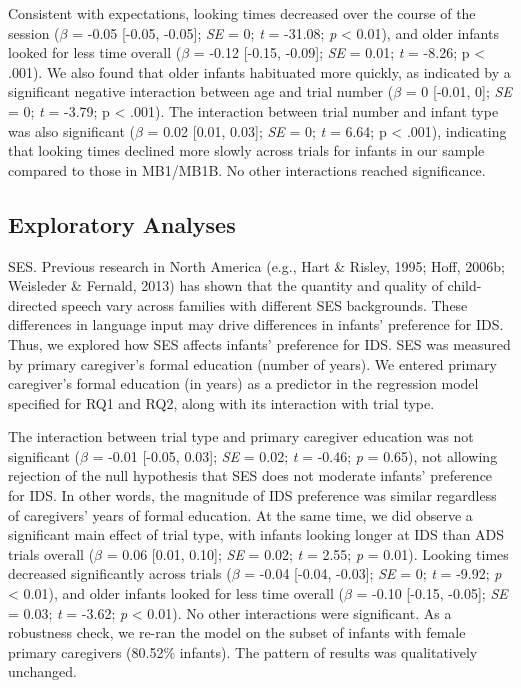 \documentclass[
  english,
  ,man,floatsintext]{apa6}
\begin{document}
Consistent with expectations, looking times decreased over the course of the session (\emph{\(\beta\)} = -0.05 {[}-0.05, -0.05{]}; \emph{SE} = 0; \emph{t} = -31.08; \emph{p} \textless{} 0.01), and older infants looked for less time overall (\emph{\(\beta\)} = -0.12 {[}-0.15, -0.09{]}; \emph{SE} = 0.01; \emph{t} = -8.26; p \textless{} .001). We also found that older infants habituated more quickly, as indicated by a significant negative interaction between age and trial number (\emph{\(\beta\)} = 0 {[}-0.01, 0{]}; \emph{SE} = 0; \emph{t} = -3.79; p \textless{} .001). The interaction between trial number and infant type was also significant (\emph{\(\beta\)} = 0.02 {[}0.01, 0.03{]}; \emph{SE} = 0; \emph{t} = 6.64; p \textless{} .001), indicating that looking times declined more slowly across trials for infants in our sample compared to those in MB1/MB1B. No other interactions reached significance.

\subsection{Exploratory Analyses}\label{exploratory-analyses}

SES. Previous research in North America (e.g., Hart \& Risley, 1995; Hoff, 2006b; Weisleder \& Fernald, 2013) has shown that the quantity and quality of child-directed speech vary across families with different SES backgrounds. These differences in language input may drive differences in infants' preference for IDS. Thus, we explored how SES affects infants' preference for IDS. SES was measured by primary caregiver's formal education (number of years). We entered primary caregiver's formal education (in years) as a predictor in the regression model specified for RQ1 and RQ2, along with its interaction with trial type.

The interaction between trial type and primary caregiver education was not significant (\emph{\(\beta\)} = -0.01 {[}-0.05, 0.03{]}; \emph{SE} = 0.02; \emph{t} = -0.46; \emph{p} = 0.65), not allowing rejection of the null hypothesis that SES does not moderate infants' preference for IDS. In other words, the magnitude of IDS preference was similar regardless of caregivers' years of formal education. At the same time, we did observe a significant main effect of trial type, with infants looking longer at IDS than ADS trials overall (\emph{\(\beta\)} = 0.06 {[}0.01, 0.10{]}; \emph{SE} = 0.02; \emph{t} = 2.55; \emph{p} = 0.01). Looking times decreased significantly across trials (\emph{\(\beta\)} = -0.04 {[}-0.04, -0.03{]}; \emph{SE} = 0; \emph{t} = -9.92; \emph{p} \textless{} 0.01), and older infants looked for less time overall (\emph{\(\beta\)} = -0.10 {[}-0.15, -0.05{]}; \emph{SE} = 0.03; \emph{t} = -3.62; \emph{p} \textless{} 0.01). No other interactions were significant. As a robustness check, we re-ran the model on the subset of infants with female primary caregivers (80.52\% infants). The pattern of results was qualitatively unchanged.
\end{document}
